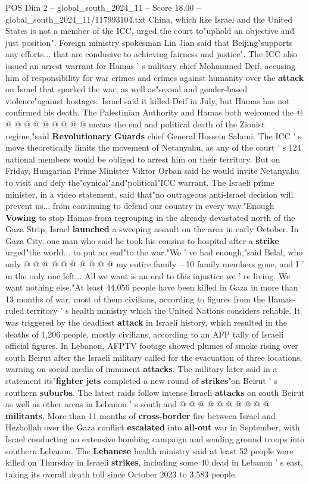 \begin{textsample}{POS Dim 2 – global\_south\_2024\_11 – Score 18.00 – global\_south\_2024\_11/117993104.txt}
China, which like Israel and the United States is not a member of the ICC, urged the court to"uphold an objective and just position".
Foreign ministry spokesman Lin Jian said that Beijing"supports any efforts... that are conducive to achieving fairness and justice".
The ICC also issued an arrest warrant for Hamas ' s military chief Mohammed Deif, accusing him of responsibility for war crimes and crimes against humanity over the \textbf{attack} on Israel that sparked the war, as well as"sexual and gender-based violence"against hostages.
Israel said it killed Deif in July, but Hamas has not confirmed his death.
The Palestinian Authority and Hamas both welcomed the @ @ @ @ @ @ @ @ @ @ means the end and political death of the Zionist regime,"said \textbf{Revolutionary} \textbf{Guards} chief General Hossein Salami.
The ICC ' s move theoretically limits the movement of Netanyahu, as any of the court ' s 124 national members would be obliged to arrest him on their territory.
But on Friday, Hungarian Prime Minister Viktor Orban said he would invite Netanyahu to visit and defy the"cynical"and"political"ICC warrant.
The Israeli prime minister, in a video statement, said that"no outrageous anti-Israel decision will prevent us... from continuing to defend our country in every way."Enough \textbf{Vowing} to stop Hamas from regrouping in the already devastated north of the Gaza Strip, Israel \textbf{launched} a sweeping assault on the area in early October.
In Gaza City, one man who said he took his cousins to hospital after a \textbf{strike} urged"the world... to put an end"to the war."We ' ve had enough,"said Belal, who only @ @ @ @ @ @ @ @ @ @ my entire family -- 10 family members gone, and I ' m the only one left...
All we want is an end to this injustice we ' re living.
We want nothing else."At least 44,056 people have been killed in Gaza in more than 13 months of war, most of them civilians, according to figures from the Hamas-ruled territory ' s health ministry which the United Nations considers reliable.
It was triggered by the deadliest \textbf{attack} in Israeli history, which resulted in the deaths of 1,206 people, mostly civilians, according to an AFP tally of Israeli official figures.
In Lebanon, AFPTV footage showed plumes of smoke rising over south Beirut after the Israeli military called for the evacuation of three locations, warning on social media of imminent \textbf{attacks}.
The military later said in a statement its"\textbf{fighter} \textbf{jets} completed a new round of \textbf{strikes}"on Beirut ' s southern \textbf{suburbs}.
The latest raids follow intense Israeli \textbf{attacks} on south Beirut as well as other areas in Lebanon ' s south and @ @ @ @ @ @ @ @ @ @ \textbf{militants}.
More than 11 months of \textbf{cross-border} fire between Israel and Hezbollah over the Gaza conflict \textbf{escalated} into \textbf{all-out} war in September, with Israel conducting an extensive bombing campaign and sending ground troops into southern Lebanon.
The \textbf{Lebanese} health ministry said at least 52 people were killed on Thursday in Israeli \textbf{strikes}, including some 40 dead in Lebanon ' s east, taking its overall death toll since October 2023 to 3,583 people.


\end{textsample}
